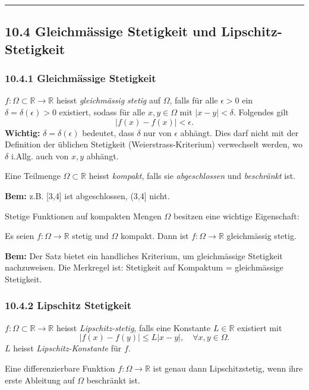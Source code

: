 \documentclass[a4paper,landscape,8pt]{extarticle}
\newcommand{\R}{\mathbb{R}}
\newcommand{\abs}[1]{\left\lvert #1 \right\rvert}
\newcommand{\sep}{\vspace{5pt}\noindent\hrule\vspace{5pt}}
\newcommand{\Bem}{\textbf{Bem: }}
\newcommand{\Wichtig}{\textbf{Wichtig: }}
\begin{document}
\begin{multicols*}{4}
\begin{warmup}
\sep

\end{warmup}

\subsection{10.4 Gleichmässige Stetigkeit und Lipschitz-Stetigkeit}

\subsubsection{10.4.1 Gleichmässige Stetigkeit}

\Def $f\colon\Omega\subset\R\to\R$ heisst \emph{gleichmässig stetig} auf
$\Omega$, falls für alle $\epsilon> 0$ ein $\delta=\delta(\epsilon)>0$
existiert, sodass für alle $x,y\in\Omega$ mit $\abs{x-y}<\delta$. Folgendes gilt
\[
\abs{f(x)-f(x)} < \epsilon.
\]
\Wichtig $\delta = \delta(\epsilon)$ bedeutet, dass $\delta$ nur von $\epsilon$
abhängt.
Dies darf nicht mit der Definition der üblichen Stetigkeit
(Weierstrass-Kriterium) verwechselt werden, wo $\delta$ i.Allg. auch von $x,y$
abhängt.

\Def Eine Teilmenge $\Omega\subset\R$ heisst \emph{kompakt}, falls sie
\emph{abgeschlossen} und \emph{beschränkt} ist.
 
\Bem z.B. [3,4] ist abgeschlossen, (3,4] nicht.

Stetige Funktionen auf kompakten Mengen $\Omega$ besitzen eine wichtige
Eigenschaft:

\Satz Es seien $f\colon \Omega \to\R$ stetig und $\Omega$ kompakt. Dann ist
$f\colon\Omega\to\R$ gleichmässig stetig.

\Bem Der Satz bietet ein handliches Kriterium, um gleichmässige Stetigkeit
nachzuweisen. Die Merkregel ist: Stetigkeit auf Kompaktum = gleichmässige
Stetigkeit.

\subsubsection{10.4.2 Lipschitz Stetigkeit}

\Def $f\colon\Omega\subset\R\to\R$ heisst \emph{Lipschitz-stetig}, falls eine
Konstante $L\in\R$ existiert mit
\[
\abs{f(x)-f(y)} \leq L \abs{x-y}, \quad \forall x,y \in \Omega.
\]
$L$ heisst \emph{Lipschitz-Konstante} für $f$.

\Satz Eine differenzierbare Funktion $f\colon\Omega\to\R$ ist genau dann
Lipschitzstetig, wenn ihre erste Ableitung auf $\Omega$ beschränkt ist.


\end{multicols*}
\end{document}
